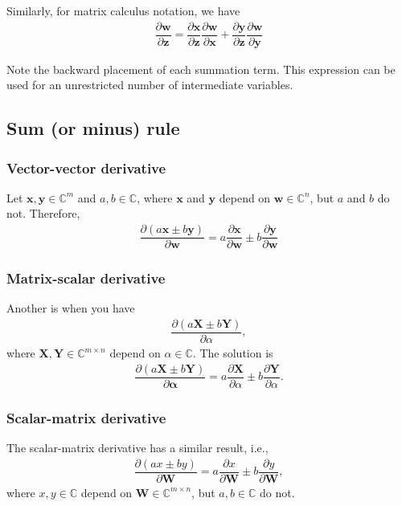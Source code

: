 \documentclass{article}
\begin{document}
Similarly, for matrix calculus notation, we have
\begin{align}
    \label{eq:chain-multi-inter}
    \dfrac{\partial \mathbf{w}}{\partial \mathbf{z}} = \dfrac{\partial \mathbf{x}}{\partial \mathbf{z}} \dfrac{\partial \mathbf{w}}{\partial \mathbf{x}} + \dfrac{\partial \mathbf{y}}{\partial \mathbf{z}} \dfrac{\partial \mathbf{w}}{\partial \mathbf{y}}
\end{align}

Note the backward placement of each summation term. This expression can be used for an unrestricted number of intermediate variables.

\subsection{Sum (or minus) rule}
\subsubsection{Vector-vector derivative}
Let \(\mathbf{x}, \mathbf{y} \in \mathbb{C}^{m}\) and \(a, b \in \mathbb{C}\), where \(\mathbf{x}\) and \(\mathbf{y}\) depend on \(\mathbf{w} \in \mathbb{C}^{n}\), but \(a\) and \(b\) do not. Therefore,
\begin{align}
    \dfrac{\partial (a\mathbf{x} \pm b\mathbf{y})}{\partial\mathbf{w}} = a\dfrac{\partial \mathbf{x}}{\partial\mathbf{w}} \pm b\dfrac{\partial \mathbf{y}}{\partial\mathbf{w}}
\end{align}
\subsubsection{Matrix-scalar derivative}
Another is when you have
\begin{align}
    \dfrac{\partial \left( a\mathbf{X} \pm b\mathbf{Y} \right)}{\partial \alpha},
\end{align}
where \(\mathbf{X}, \mathbf{Y} \in \mathbb{C}^{m \times n}\) depend on \(\alpha \in \mathbb{C}\). The solution is
\begin{align}
    \dfrac{\partial (a\mathbf{X} \pm b\mathbf{Y})}{\partial\mathbf{\alpha}} = a\dfrac{\partial \mathbf{X}}{\partial \alpha} \pm b \dfrac{\partial \mathbf{Y}}{\partial \alpha}.
\end{align}
\subsubsection{Scalar-matrix derivative}
The scalar-matrix derivative has a similar result, i.e.,
\begin{align}
    \dfrac{\partial \left( ax \pm by \right)}{\partial \mathbf{W}} = a\dfrac{\partial x}{\partial \mathbf{W}} \pm b \dfrac{\partial y}{\partial \mathbf{W}},
\end{align}
where \(x, y \in \mathbb{C}\) depend on \(\mathbf{W} \in \mathbb{C}^{m\times n}\), but \(a,b \in \mathbb{C}\) do not.
\end{document}
